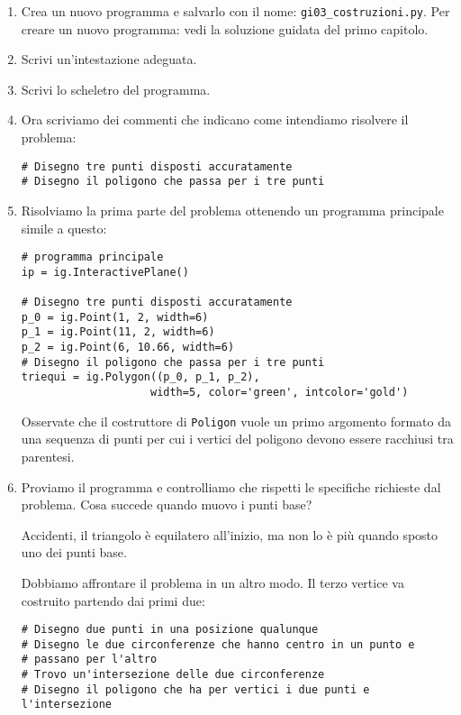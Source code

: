 \begin{enumerate} [noitemsep]
\item Crea un nuovo programma e salvarlo con il nome: 
 \texttt{gi03\_costruzioni.py}.
 Per creare un nuovo programma: vedi la soluzione guidata del primo capitolo.

\item Scrivi un'intestazione adeguata.

\item Scrivi lo scheletro del programma.

\item Ora scriviamo dei commenti che indicano come intendiamo risolvere il
problema:

\begin{lstlisting}
# Disegno tre punti disposti accuratamente
# Disegno il poligono che passa per i tre punti
\end{lstlisting}

\item Risolviamo la prima parte del problema ottenendo un programma principale
simile a questo:

\begin{lstlisting}
# programma principale
ip = ig.InteractivePlane()

# Disegno tre punti disposti accuratamente
p_0 = ig.Point(1, 2, width=6)
p_1 = ig.Point(11, 2, width=6)
p_2 = ig.Point(6, 10.66, width=6)
# Disegno il poligono che passa per i tre punti
triequi = ig.Polygon((p_0, p_1, p_2),
                    width=5, color='green', intcolor='gold')
\end{lstlisting}

Osservate che il costruttore di \texttt{Poligon} vuole un primo argomento 
formato da una sequenza di punti per cui i vertici del poligono devono essere
racchiusi tra parentesi.

\item Proviamo il programma e controlliamo che rispetti le specifiche richieste
dal problema. Cosa succede quando muovo i punti base?

Accidenti, il triangolo è equilatero all'inizio, ma non lo è più quando
sposto uno dei punti base.

Dobbiamo affrontare il problema in un altro modo. Il terzo vertice va
costruito partendo dai primi due:

\begin{lstlisting}
# Disegno due punti in una posizione qualunque
# Disegno le due circonferenze che hanno centro in un punto e 
# passano per l'altro
# Trovo un'intersezione delle due circonferenze
# Disegno il poligono che ha per vertici i due punti e l'intersezione
\end{lstlisting}


\end{enumerate}
